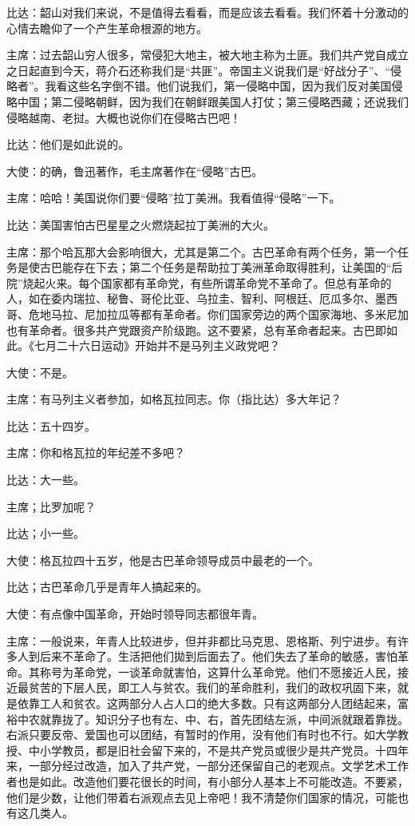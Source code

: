 比达：韶山对我们来说，不是值得去看看，而是应该去看看。我们怀着十分激动的心情去瞻仰了一个产生革命根源的地方。

主席：过去韶山穷人很多，常侵犯大地主，被大地主称为土匪。我们共产党自成立之日起直到今天，蒋介石还称我们是“共匪”。帝国主义说我们是“好战分子”、“侵略者”。我看这些名字倒不错。他们说我们，第一侵略中国，因为我们反对美国侵略中国；第二侵略朝鲜，因为我们在朝鲜跟美国人打仗；第三侵略西藏；还说我们侵略越南、老挝。大概也说你们在侵略古巴吧！

比达：他们是如此说的。

大使：的确，鲁迅著作，毛主席著作在“侵略”古巴。

主席：哈哈！美国说你们要“侵略”拉丁美洲。我看值得“侵略”一下。

比达：美国害怕古巴星星之火燃烧起拉丁美洲的大火。

主席：那个哈瓦那大会影响很大，尤其是第二个。古巴革命有两个任务，第一个任务是使古巴能存在下去；第二个任务是帮助拉丁美洲革命取得胜利，让美国的“后院”烧起火来。每个国家都有革命党，有些所谓革命党不革命了。但总有革命的人，如在委内瑞拉、秘鲁、哥伦比亚、乌拉圭、智利、阿根廷、厄瓜多尔、墨西哥、危地马拉、尼加拉瓜等都有革命者。你们国家旁边的两个国家海地、多米尼加也有革命者。很多共产党跟资产阶级跑。这不要紧，总有革命者起来。古巴即如此。《七月二十六日运动》开始并不是马列主义政党吧？

大使：不是。

主席：有马列主义者参加，如格瓦拉同志。你（指比达）多大年记？

比达：五十四岁。

主席：你和格瓦拉的年纪差不多吧？

比达：大一些。

主席；比罗加呢？

比达；小一些。

大使：格瓦拉四十五岁，他是古巴革命领导成员中最老的一个。

比达；古巴革命几乎是青年人搞起来的。

大使：有点像中国革命，开始时领导同志都很年青。

主席：一般说来，年青人比较进步，但并非都比马克思、恩格斯、列宁进步。有许多人到后来不革命了。生活把他们拋到后面去了。他们失去了革命的敏感，害怕革命。其称号为革命党，一谈革命就害怕，这算什么革命党。他们不愿接近人民，接近最贫苦的下层人民，即工人与贫农。我们的革命胜利，我们的政权巩固下来，就是依靠工人和贫农。这两部分人占人口的绝大多数。只有这两部分人团结起来，富裕中农就靠拢了。知识分子也有左、中、右，首先团结左派，中间派就跟着靠拢。右派只要反帝、爱国也可以团结，有暂时的作用，没有他们有时也不行。如大学教授、中小学教员，都是旧社会留下来的，不是共产党员或很少是共产党员。十四年来，一部分经过改造，加入了共产党，一部分还保留自己的老观点。文学艺术工作者也是如此。改造他们要花很长的时间，有小部分人基本上不可能改造。不要紧，他们是少数，让他们带着右派观点去见上帝吧！我不清楚你们国家的情况，可能也有这几类人。

